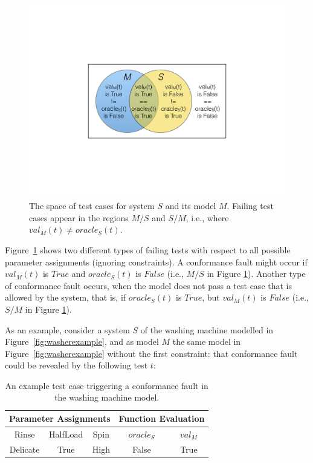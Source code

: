 \begin{tikzborder}{\cite{Gargantini16:validation}}
\begin{tikzborder}{\cite{gargantini_combinatorial_2017}}
\begin{figure}[h]
	\begin{center}
		\includegraphics[width=0.6\columnwidth]{images/venndiagram.pdf}
	\end{center}
	\caption{The space of test cases for system $S$ and its model $M$. Failing test cases appear in the regions $M / S$ and $S / M$, i.e., where $val_{M}(t) \neq \mathit{oracle}_{S}(t)$.}
	\label{fig:correctAndFaults}
\end{figure}

\bb 
Figure~\ref{fig:correctAndFaults} shows two different types of failing tests with respect to all possible parameter assignments (ignoring constraints). 
A conformance fault might occur if $val_{M}(t)$ is $\mathit{True}$ and $\mathit{oracle}_{S}(t)$ is $\mathit{False}$ (i.e., $M/S$ in Figure \ref{fig:correctAndFaults}). Another type of conformance fault occurs, when the model does not pass a test case that is allowed by the system, that is, if $\mathit{oracle}_{S}(t)$ is $\mathit{True}$, but $val_{M}(t)$ is $\mathit{False}$ (i.e., $S/M$ in Figure \ref{fig:correctAndFaults}).\be
\begin{example}
	\bb As an example, consider a system $S$ of the washing machine modelled in Figure~\ref{fig:washerexample}, and as model $M$ the same model in Figure~\ref{fig:washerexample} without the first constraint: that conformance fault could be revealed by the following test $t$:\be
	
	\begin{table}[h]
		\centering
		\begin{tabular}{ccc|cc}
			\multicolumn{3}{c|}{Parameter Assignments} & \multicolumn{2}{c}{Function Evaluation} \\ 
			\hline
			Rinse & HalfLoad & Spin & $\mathit{oracle}_{S}$ & $val_M$ \\
			\hline 
			Delicate & True & High & False & True \\ 
		\end{tabular} \label{tab:conformanceFaultExample} \caption{An example test case triggering a conformance fault in the washing machine model.}
		\label{ex:conformancefault}
	\end{table}
\end{example}


\end{tikzborder}
\end{tikzborder}
